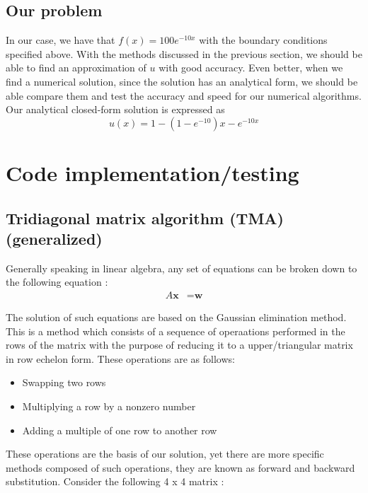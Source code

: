 \documentclass{article}
\begin{document}
\subsection{Our problem}
In our case, we have that $f(x)=100 e^{-10x}$ with the boundary conditions specified above. With the methods discussed in the previous section, we should be able to find an approximation of $u$ with good accuracy. Even better, when we find a numerical solution, since the solution has an analytical form, we should be able compare them and test the accuracy and speed for our numerical algorithms. Our analytical closed-form solution is expressed as $$u(x)=1-(1-e^{-10})x-e^{-10x}$$

\section{Code implementation/testing}
\subsection{Tridiagonal matrix algorithm (TMA) (generalized)}
Generally speaking in linear algebra, any set of equations can be broken down to the following equation :
\begin{align*}
 {A}\textbf{x} &= \textbf{w}
\end{align*}

The solution of such equations are based on the Gaussian elimination method. This is a method which consists of a sequence of operaations performed in the rows of the matrix with the purpose of reducing it to a upper/triangular matrix in row echelon form. These operations are as follows:\\

\begin{itemize}
  \item Swapping two rows
  \item Multiplying a row by a nonzero number
  \item Adding a multiple of one row to another row
\end{itemize}

These operations are the basis of our solution, yet there are more specific methods composed of such operations, they are known as forward and backward substitution. Consider the following 4 x 4 matrix :
\end{document}
